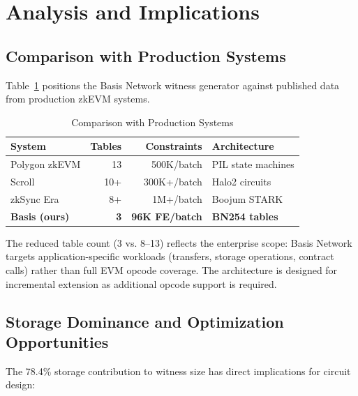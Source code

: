 \documentclass[conference]{IEEEtran}
\begin{document}
\section{Analysis and Implications}
\label{sec:analysis}

\subsection{Comparison with Production Systems}

Table~\ref{tab:comparison} positions the Basis Network witness
generator against published data from production zkEVM systems.

\begin{table}[htbp]
\caption{Comparison with Production Systems}
\label{tab:comparison}
\centering
\begin{tabular}{p{2.2cm}rrp{2.3cm}}
\toprule
\textbf{System} & \textbf{Tables} & \textbf{Constraints} & \textbf{Architecture} \\
\midrule
Polygon zkEVM  & 13  & 500K/batch  & PIL state machines \\
Scroll         & 10+ & 300K+/batch & Halo2 circuits \\
zkSync Era     & 8+  & 1M+/batch   & Boojum STARK \\
\textbf{Basis (ours)} & \textbf{3} & \textbf{96K FE/batch} & \textbf{BN254 tables} \\
\bottomrule
\end{tabular}
\end{table}

The reduced table count (3 vs. 8--13) reflects the enterprise scope:
Basis Network targets application-specific workloads (transfers,
storage operations, contract calls) rather than full EVM opcode
coverage. The architecture is designed for incremental extension as
additional opcode support is required.

\subsection{Storage Dominance and Optimization Opportunities}

The 78.4\% storage contribution to witness size has direct implications
for circuit design:
\end{document}
